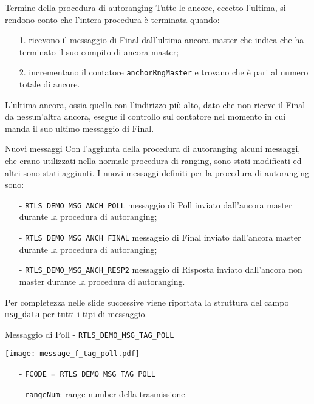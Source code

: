 \begin{frame}{Termine della procedura di autoranging}
  Tutte le ancore, eccetto l'ultima, si rendono conto che l'intera procedura è terminata quando:
  \begin{itemize}
  \item [1.] ricevono il messaggio di Final dall'\alert{ultima} ancora master che indica che ha terminato il suo compito di ancora master;
  \item [2.] incrementano il contatore \lstinline!anchorRngMaster! e trovano che è pari al numero totale di ancore.
  \end{itemize}
  L'ultima ancora, ossia quella con l'indirizzo più alto, dato che non riceve il Final da nessun'altra ancora, esegue il controllo sul
  contatore nel momento in cui manda il suo ultimo messaggio di Final.
\end{frame}

\begin{frame}{Nuovi messaggi}
  Con l'aggiunta della procedura di autoranging alcuni messaggi, che erano utilizzati nella normale procedura di ranging, sono stati modificati
  ed altri sono stati aggiunti.
  I nuovi messaggi definiti per la procedura di autoranging sono:
  \begin{itemize}
  \item[-]\lstinline!RTLS_DEMO_MSG_ANCH_POLL! messaggio di Poll inviato dall'ancora \alert{master} durante la procedura di autoranging;
  \item[-]\lstinline!RTLS_DEMO_MSG_ANCH_FINAL! messaggio di Final inviato dall'ancora \alert{master} durante la procedura di autoranging;
  \item[-]\lstinline!RTLS_DEMO_MSG_ANCH_RESP2! messaggio di Risposta inviato dall'ancora \alert{non master} durante la procedura di autoranging.
  \end{itemize}
  Per completezza nelle slide successive viene riportata la struttura del campo \lstinline!msg_data! per tutti i tipi
  di messaggio.
\end{frame}

\begin{frame}{Messaggio di Poll - \lstinline!RTLS_DEMO_MSG_TAG_POLL!}
  \begin{center}
    \texttt{[image: message\_f\_tag\_poll.pdf]}
  \end{center}
  \begin{itemize}
  \item[-] \lstinline!FCODE = RTLS_DEMO_MSG_TAG_POLL!
  \item[-] \lstinline!rangeNum!: range number della trasmissione
  \end{itemize}
\end{frame}

